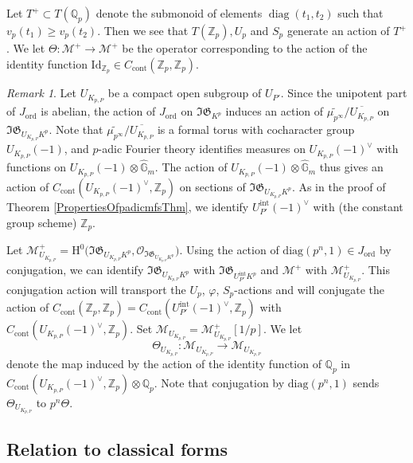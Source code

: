 \documentclass[10pt, oneside]{amsart}
\renewcommand{\tilde}{\widetilde}
\numberwithin{equation}{subsection}
\theoremstyle{definition}
\theoremstyle{remark}
\newtheorem{remark}[equation]{Remark}
\newcommand{\mbb}[1]{\mathbb{#1}}
\newcommand{\opn}[1]{\operatorname{#1}}
\def\Q{\mathbb{Q}}
\def\Z{{\mathbb{Z}}}
\begin{document}
Let $T^+ \subset T(\mbb{Q}_p)$ denote the submonoid of elements $\opn{diag}(t_1, t_2)$ such that $v_p(t_1) \geq v_p(t_2)$. Then we see that $T(\Z_p), U_p$ and $S_p$ generate an action of $T^+$. We let $\Theta \colon \mathscr{M}^+ \to \mathscr{M}^+$ be the operator corresponding to the action of the identity function $\mathrm{Id}_{\Z_p} \in C_{\opn{cont}}(\mbb{Z}_p, \mbb{Z}_p)$. 

\begin{remark} 
Let $U_{K_{p,P}}$ be a compact open subgroup of $U_{P'}$. Since the unipotent part of $J_{\opn{ord}}$ is abelian, the action of $J_{\opn{ord}}$ on $\mathfrak{IG}_{K^p}$ induces an action of $\tilde{\mu_{p^{\infty}}}/\overline{U_{K_{p, P}}}$ on $\mathfrak{IG}_{U_{K_{p, P}}K^p}$. Note that $\tilde{\mu_{p^{\infty}}}/\overline{U_{K_{p, P}}}$ is a formal torus with cocharacter group $U_{K_{p, P}}(-1)$, and $p$-adic Fourier theory identifies measures on $U_{K_{p, P}}(-1)^{\vee}$ with functions on $U_{K_{p, P}}(-1) \otimes \widehat{\mbb{G}}_m$. The action of $U_{K_{p, P}}(-1) \otimes \widehat{\mathbb{G}}_m$ thus gives an action of $C_{\opn{cont}}(U_{K_{p, P}}(-1)^{\vee}, \Z_p)$ on sections of $\mathfrak{IG}_{U_{K_{p, P}} K^p}$. As in the proof of Theorem \ref{PropertiesOfpadicmfsThm}, we identify $U_{P'}^{\opn{int}}(-1)^{\vee}$ with (the constant group scheme) $\Z_p$.
\end{remark}

Let $\mathscr{M}^+_{U_{K_{p,P}}} =  \mathrm{H}^0\big(\mathfrak{IG}_{U_{K_{p,P}} K^p}, \mathcal{O}_{\mathfrak{IG}_{U_{K_{p,P}}K^p}}\big)$. Using the action of $\mathrm{diag}(p^n,1) \in J_{\opn{ord}}$ by conjugation, we can identify $\mathfrak{IG}_{U_{K_{p,P}} K^p}$ with $\mathfrak{IG}_{U_{P'}^{\opn{int}} K^p}$ and $\mathscr{M}^+$ with $\mathscr{M}^+_{U_{K_{p,P}}}$. This conjugation action will transport the $U_p$, $\varphi$, $S_p$-actions and will conjugate the action of $C_{\opn{cont}}(\Z_p, \Z_p) =  C_{\opn{cont}}(U_{P'}^{\opn{int}}(-1)^\vee, \Z_p)$ with $C_{\opn{cont}}(U_{K_{p,P}}(-1)^\vee, \Z_p)$. Set $\mathscr{M}_{{U_{K_{p,P}}}} = \mathscr{M}_{{U_{K_{p,P}}}}^+[1/p]$. We let 
\[
\Theta_{U_{K_{p,P}}} \colon \mathscr{M}_{U_{K_{p,P}}} \rightarrow \mathscr{M}_{U_{K_{p,P}}}
\]
denote the map induced by the action of the identity function of $\Q_p$ in $C_{\opn{cont}}(U_{K_{p, P}}(-1)^\vee, \Z_p) \otimes \Q_p$. Note that conjugation by  $\mathrm{diag}(p^n,1)$ sends $\Theta_{U_{K_{p,P}}}$ to $p^n \Theta$. 

\subsection{Relation to classical forms}
\end{document}
